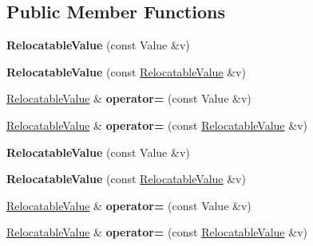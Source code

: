 \subsection*{Public Member Functions}
\begin{DoxyCompactItemize}
\item 
\hypertarget{classjs_1_1_relocatable_value_ac0f7c0a74194283b5014269f2dc95538}{{\bfseries Relocatable\-Value} (const Value \&v)}\label{classjs_1_1_relocatable_value_ac0f7c0a74194283b5014269f2dc95538}

\item 
\hypertarget{classjs_1_1_relocatable_value_a839029dcd57d9fecaf4c063e34fdcd49}{{\bfseries Relocatable\-Value} (const \hyperlink{classjs_1_1_relocatable_value}{Relocatable\-Value} \&v)}\label{classjs_1_1_relocatable_value_a839029dcd57d9fecaf4c063e34fdcd49}

\item 
\hypertarget{classjs_1_1_relocatable_value_ac80d678d705b004fadb88b34691b448e}{\hyperlink{classjs_1_1_relocatable_value}{Relocatable\-Value} \& {\bfseries operator=} (const Value \&v)}\label{classjs_1_1_relocatable_value_ac80d678d705b004fadb88b34691b448e}

\item 
\hypertarget{classjs_1_1_relocatable_value_a50352f71d07f0d4a5f87f83ad50791e3}{\hyperlink{classjs_1_1_relocatable_value}{Relocatable\-Value} \& {\bfseries operator=} (const \hyperlink{classjs_1_1_relocatable_value}{Relocatable\-Value} \&v)}\label{classjs_1_1_relocatable_value_a50352f71d07f0d4a5f87f83ad50791e3}

\item 
\hypertarget{classjs_1_1_relocatable_value_ac0f7c0a74194283b5014269f2dc95538}{{\bfseries Relocatable\-Value} (const Value \&v)}\label{classjs_1_1_relocatable_value_ac0f7c0a74194283b5014269f2dc95538}

\item 
\hypertarget{classjs_1_1_relocatable_value_a839029dcd57d9fecaf4c063e34fdcd49}{{\bfseries Relocatable\-Value} (const \hyperlink{classjs_1_1_relocatable_value}{Relocatable\-Value} \&v)}\label{classjs_1_1_relocatable_value_a839029dcd57d9fecaf4c063e34fdcd49}

\item 
\hypertarget{classjs_1_1_relocatable_value_ac80d678d705b004fadb88b34691b448e}{\hyperlink{classjs_1_1_relocatable_value}{Relocatable\-Value} \& {\bfseries operator=} (const Value \&v)}\label{classjs_1_1_relocatable_value_ac80d678d705b004fadb88b34691b448e}

\item 
\hypertarget{classjs_1_1_relocatable_value_a50352f71d07f0d4a5f87f83ad50791e3}{\hyperlink{classjs_1_1_relocatable_value}{Relocatable\-Value} \& {\bfseries operator=} (const \hyperlink{classjs_1_1_relocatable_value}{Relocatable\-Value} \&v)}\label{classjs_1_1_relocatable_value_a50352f71d07f0d4a5f87f83ad50791e3}

\end{DoxyCompactItemize}


